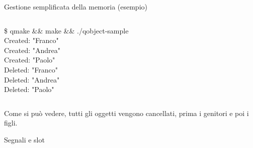 \documentclass{beamer}
\begin{document}
\begin{frame}{Gestione semplificata della memoria (esempio)}
\begin{columns}
		\begin{block}{}\tiny
			{\ttfamily \$ qmake \&\& make \&\& ./qobject-sample\\
				Created:  "Franco"\\
				Created:  "Andrea"\\
				Created:  "Paolo"\\
				Deleted:  "Franco"\\
				Deleted:  "Andrea"\\
				Deleted:  "Paolo"\\
			}
		\end{block}
	\end{columns}
	\bigskip
	Come si può vedere, tutti gli oggetti vengono cancellati, prima i genitori e poi i figli.
\end{frame}

\begin{frame}{Segnali e slot}

	
\end{frame}
\end{document}
